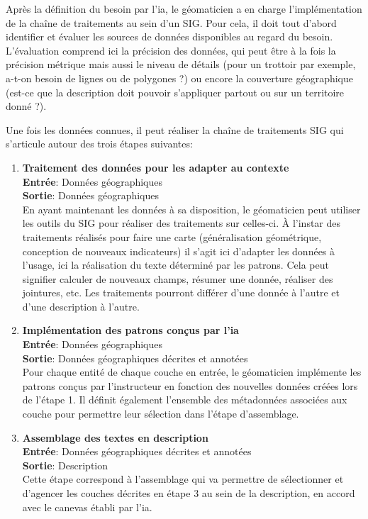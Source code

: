 Après la définition du besoin par l’\gls{ia}, le géomaticien a en charge l’implémentation de la chaîne de traitements au sein d’un SIG. Pour cela, il doit tout d’abord identifier et évaluer les sources de données disponibles au regard du besoin. L’évaluation comprend ici la précision des données, qui peut être à la fois la précision métrique mais aussi le niveau de détails (pour un trottoir par exemple, a-t-on besoin de lignes ou de polygones ?) ou encore la couverture géographique (est-ce que la description doit pouvoir s’appliquer partout ou sur un territoire donné ?).

\newpar{}

Une fois les données connues, il peut réaliser la chaîne de traitements SIG qui s’articule autour des trois étapes suivantes:

\begin{enumerate}
    \item \textbf{Traitement des données pour les adapter au contexte}\\
            \textbf{Entrée}: Données géographiques\\
            \textbf{Sortie}: Données géographiques\\
            En ayant maintenant les données à sa disposition, le géomaticien peut utiliser les outils du SIG pour réaliser des traitements sur celles-ci. À l’instar des traitements réalisés pour faire une carte (généralisation géométrique, conception de nouveaux indicateurs) il s’agit ici d’adapter les données à l’usage, ici la réalisation du texte déterminé par les patrons. Cela peut signifier calculer de nouveaux champs, résumer une donnée, réaliser des jointures, etc. Les traitements pourront différer d’une donnée à l’autre et d’une description à l’autre.
    \item \textbf{Implémentation des patrons conçus par l’\gls{ia}}\\
        \textbf{Entrée}: Données géographiques\\
        \textbf{Sortie}: Données géographiques décrites et annotées\\
        Pour chaque entité de chaque couche en entrée, le géomaticien implémente les patrons conçus par l’instructeur en fonction des nouvelles données créées lors de l’étape 1. Il définit également l’ensemble des métadonnées associées aux couche pour permettre leur sélection dans l’étape d’assemblage. 
    \item \textbf{Assemblage des textes en description}\\
        \textbf{Entrée}: Données géographiques décrites et annotées\\
        \textbf{Sortie}: Description\\
        Cette étape correspond à l’assemblage qui va permettre de sélectionner et d’agencer les couches décrites en étape 3 au sein de la description, en accord avec le canevas établi par l’\gls{ia}.
\end{enumerate}

